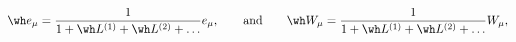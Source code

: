 \begin{equation}
\wh e_\mu = \frac1{1+\wh L^{(1)}+\wh L^{(2)}+\ldots} 
e_\mu, \qquad \mbox{and} \qquad 
\wh W_\mu = \frac1{1+\wh L^{(1)}+\wh L^{(2)}+\ldots} 
W_\mu,
\end{equation}

